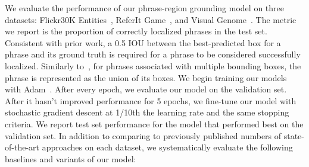 \documentclass[runningheads]{llncs}
\begin{document}
We evaluate the performance of our phrase-region grounding model on three datasets: Flickr30K Entities~\cite{flickrentitiesijcv}, ReferIt Game~\cite{kazemzadeh-EtAl:2014:EMNLP2014}, and Visual Genome~\cite{krishnavisualgenome}. The metric we report is the proportion of correctly localized phrases in the test set. Consistent with prior work, a 0.5 IOU between the best-predicted box for a phrase and its ground truth is required for a phrase to be considered successfully localized.    Similarly to~\cite{wangTwoBranch2017,plummerPLCLC2017,ChenICCV2017}, for phrases associated with multiple bounding boxes, the phrase is represented as the union of its boxes.
\smallskip{} We begin training our models with Adam~\cite{adam}.  After every epoch, we evaluate our model on the validation set. After it hasn't improved performance for 5 epochs, we fine-tune our model with stochastic gradient descent at 1/10th the learning rate and the same stopping criteria.  We report test set performance for the model that performed best on the validation set.
\smallskip{} In addition to comparing to previously published numbers of state-of-the-art approaches on each dataset, we systematically evaluate the following baselines and variants of our model:
\end{document}
